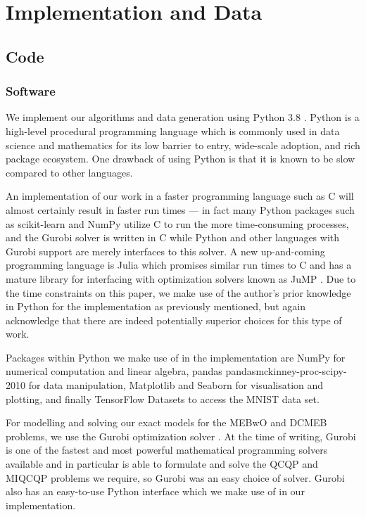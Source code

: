\documentclass[11pt,twoside]{report}
\theoremstyle{definition}
\numberwithin{theorem}{section}
\numberwithin{definition}{section}
\numberwithin{lemma}{section}
\numberwithin{proposition}{section}
\numberwithin{equation}{section}
\numberwithin{figure}{section}
\begin{document}
\chapter{Implementation and Data}\label{implementation}
\section{Code}
\subsection{Software}\label{sec:software}
We implement our algorithms and data generation using Python 3.8 \cite{python}. Python is a high-level procedural programming language which is commonly used in data science and mathematics for its low barrier to entry, wide-scale adoption, and rich package ecosystem. One drawback of using Python is that it is known to be slow compared to other languages.

An implementation of our work in a faster programming language such as C \cite{kernighan2006c} will almost certainly result in faster run times --- in fact many Python packages such as scikit-learn \cite{scikit-learn} and NumPy \cite{numpy} utilize C to run the more time-consuming processes, and the Gurobi \cite{gurobi} solver is written in C while Python and other languages with Gurobi support are merely interfaces to this solver. A new up-and-coming programming language is Julia \cite{bezanson2017julia} which promises similar run times to C and has a mature library for interfacing with optimization solvers known as JuMP \cite{jump}. Due to the time constraints on this paper, we make use of the author's prior knowledge in Python for the implementation as previously mentioned, but again acknowledge that there are indeed potentially superior choices for this type of work.

Packages within Python we make use of in the implementation are NumPy \cite{numpy} for numerical computation and linear algebra, pandas \cite{pandasjeff_reback_2021_5060318}{pandasmckinney-proc-scipy-2010} for data manipulation, Matplotlib \cite{matplotlib} and Seaborn \cite{seaborn} for visualisation and plotting, and finally TensorFlow Datasets \cite{TFDS} to access the MNIST \cite{lecun2010mnist} data set.

For modelling and solving our exact models for the MEBwO and DCMEB problems, we use the Gurobi optimization solver \cite{gurobi}. At the time of writing, Gurobi is one of the fastest and most powerful mathematical programming solvers available and in particular is able to formulate and solve the QCQP and MIQCQP problems we require, so Gurobi was an easy choice of solver. Gurobi also has an easy-to-use Python interface which we make use of in our implementation.
\end{document}

